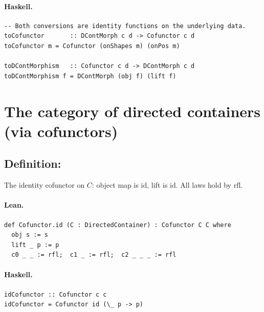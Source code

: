 \documentclass[11pt,a4paper]{article}
\begin{document}
\paragraph{Haskell.}
\begin{lstlisting}[style=haskell]
-- Both conversions are identity functions on the underlying data.
toCofunctor       :: DContMorph c d -> Cofunctor c d
toCofunctor m = Cofunctor (onShapes m) (onPos m)

toDContMorphism   :: Cofunctor c d -> DContMorph c d
toDContMorphism f = DContMorph (obj f) (lift f)
\end{lstlisting}


\section{The category of directed containers (via cofunctors)}

\subsection{Definition: }

\begin{defn}
The identity cofunctor on $C$: object map is $\mathrm{id}$, lift is $\mathrm{id}$.
All laws hold by $\mathrm{rfl}$.
\end{defn}

\paragraph{Lean.}
\begin{lstlisting}[style=lean]
def Cofunctor.id (C : DirectedContainer) : Cofunctor C C where
  obj s := s
  lift _ p := p
  c0 _ _ := rfl;  c1 _ := rfl;  c2 _ _ _ := rfl
\end{lstlisting}

\paragraph{Haskell.}
\begin{lstlisting}[style=haskell]
idCofunctor :: Cofunctor c c
idCofunctor = Cofunctor id (\_ p -> p)
\end{lstlisting}


\end{document}

